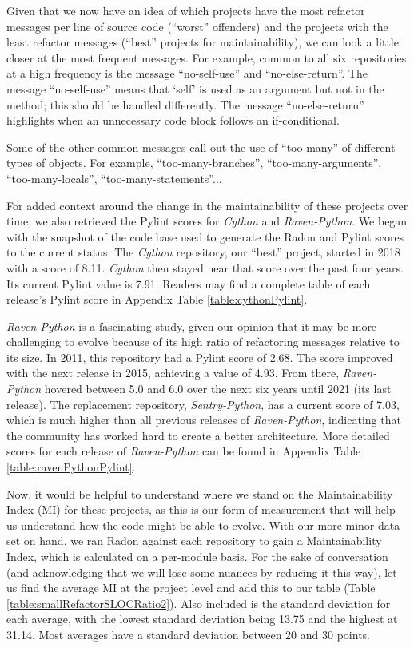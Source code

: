 Given that we now have an idea of which projects have the most refactor messages per line of source code (``worst'' offenders) and the projects with the least refactor messages (``best'' projects for maintainability), we can look a little closer at the most frequent messages. For example, common to all six repositories at a high frequency is the message ``no-self-use'' and ``no-else-return''. The message ``no-self-use'' means that `self' is used as an argument but not in the method; this should be handled differently. The message ``no-else-return'' highlights when an unnecessary code block follows an if-conditional.

Some of the other common messages call out the use of ``too many'' of different types of objects. For example, ``too-many-branches'', ``too-many-arguments'', ``too-many-locals'', ``too-many-statements''... 

For added context around the change in the maintainability of these projects over time, we also retrieved the Pylint scores for \emph{Cython} and \emph{Raven-Python}. We began with the snapshot of the code base used to generate the Radon and Pylint scores to the current status. The \emph{Cython} repository, our ``best'' project, started in 2018 with a score of 8.11. \emph{Cython} then stayed near that score over the past four years. Its current Pylint value is 7.91. Readers may find a complete table of each release's Pylint score in Appendix Table \ref{table:cythonPylint}.

\emph{Raven-Python} is a fascinating study, given our opinion that it may be more challenging to evolve because of its high ratio of refactoring messages relative to its size. In 2011, this repository had a Pylint score of 2.68. The score improved with the next release in 2015, achieving a value of 4.93. From there, \emph{Raven-Python} hovered between 5.0 and 6.0 over the next six years until 2021 (its last release). The replacement repository, \emph{Sentry-Python}, has a current score of 7.03, which is much higher than all previous releases of \emph{Raven-Python}, indicating that the community has worked hard to create a better architecture. More detailed scores for each release of \emph{Raven-Python} can be found in Appendix Table \ref{table:ravenPythonPylint}.

Now, it would be helpful to understand where we stand on the Maintainability Index (MI) for these projects, as this is our form of measurement that will help us understand how the code might be able to evolve. With our more minor data set on hand, we ran Radon against each repository to gain a Maintainability Index, which is calculated on a per-module basis. For the sake of conversation (and acknowledging that we will lose some nuances by reducing it this way), let us find the average MI at the project level and add this to our table (Table \ref{table:smallRefactorSLOCRatio2}). Also included is the standard deviation for each average, with the lowest standard deviation being 13.75 and the highest at 31.14. Most averages have a standard deviation between 20 and 30 points.

